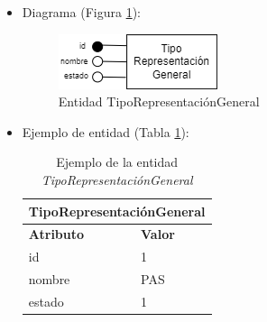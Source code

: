 \begin{itemize}
\begin{itemize}
        \item estado
        \begin{itemize}
            \item Definición: estado del tipo de representación general.
            \item Dominio: 1 (Habilitado), 0 (Deshabilitado).
            \item Tipo: atributo simple.
            \item Opcional: no
            \item Ejemplo: 1
        \end{itemize}
    \end{itemize}

    \item Diagrama (Figura \ref{fig:E-TipoRepresentaciónGeneral}):

    \begin{figure}[H]
        \centering
        \includegraphics[scale=0.8]{img/diagramas/EER/E-TipoRepresentaciónGeneral.png}
        \caption{Entidad TipoRepresentaciónGeneral}
        \label{fig:E-TipoRepresentaciónGeneral}
    \end{figure}

    \item Ejemplo de entidad (Tabla \ref{table:T-TipoRepresentaciónGeneral}):

    \begin{table}[H]
    \centering
        \begin{tabular}{ |p{6cm}||p{6cm}|  }
             \hline
                \multicolumn{2}{|c|}{\textbf{TipoRepresentaciónGeneral}} \\
             \hline
                 \textbf{Atributo} & \textbf{Valor} \\
             \hline
                 id & 1 \\
             \hline
                 nombre & PAS \\
             \hline
                 estado & 1 \\
        \end{tabular}
        \caption{Ejemplo de la entidad \textit{TipoRepresentaciónGeneral}}
        \label{table:T-TipoRepresentaciónGeneral}
    \end{table}
\end{itemize}

